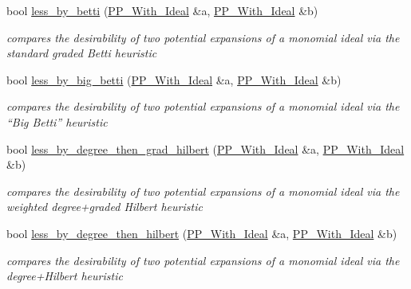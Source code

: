 \begin{DoxyCompactItemize}
bool \hyperlink{namespace_dynamic___engine_ae09287ccff877cf16afbde841c738b9b}{less\+\_\+by\+\_\+betti} (\hyperlink{group___g_b_computation_class_dynamic___engine_1_1_p_p___with___ideal}{P\+P\+\_\+\+With\+\_\+\+Ideal} \&a, \hyperlink{group___g_b_computation_class_dynamic___engine_1_1_p_p___with___ideal}{P\+P\+\_\+\+With\+\_\+\+Ideal} \&b)
\begin{DoxyCompactList}\small\item\em compares the desirability of two potential expansions of a monomial ideal via the standard graded Betti heuristic \end{DoxyCompactList}\item 
bool \hyperlink{namespace_dynamic___engine_a083c09fdc98db92614d126a5cca19a24}{less\+\_\+by\+\_\+big\+\_\+betti} (\hyperlink{group___g_b_computation_class_dynamic___engine_1_1_p_p___with___ideal}{P\+P\+\_\+\+With\+\_\+\+Ideal} \&a, \hyperlink{group___g_b_computation_class_dynamic___engine_1_1_p_p___with___ideal}{P\+P\+\_\+\+With\+\_\+\+Ideal} \&b)
\begin{DoxyCompactList}\small\item\em compares the desirability of two potential expansions of a monomial ideal via the ``Big Betti'' heuristic \end{DoxyCompactList}\item 
bool \hyperlink{namespace_dynamic___engine_ab5f217efe789e73d511ab04ae93942f1}{less\+\_\+by\+\_\+degree\+\_\+then\+\_\+grad\+\_\+hilbert} (\hyperlink{group___g_b_computation_class_dynamic___engine_1_1_p_p___with___ideal}{P\+P\+\_\+\+With\+\_\+\+Ideal} \&a, \hyperlink{group___g_b_computation_class_dynamic___engine_1_1_p_p___with___ideal}{P\+P\+\_\+\+With\+\_\+\+Ideal} \&b)
\begin{DoxyCompactList}\small\item\em compares the desirability of two potential expansions of a monomial ideal via the weighted degree+graded Hilbert heuristic \end{DoxyCompactList}\item 
bool \hyperlink{namespace_dynamic___engine_ae94f12023f4a0c1bf246afc31cd0538e}{less\+\_\+by\+\_\+degree\+\_\+then\+\_\+hilbert} (\hyperlink{group___g_b_computation_class_dynamic___engine_1_1_p_p___with___ideal}{P\+P\+\_\+\+With\+\_\+\+Ideal} \&a, \hyperlink{group___g_b_computation_class_dynamic___engine_1_1_p_p___with___ideal}{P\+P\+\_\+\+With\+\_\+\+Ideal} \&b)
\begin{DoxyCompactList}\small\item\em compares the desirability of two potential expansions of a monomial ideal via the degree+\+Hilbert heuristic \end{DoxyCompactList}\item 

\end{DoxyCompactItemize}
